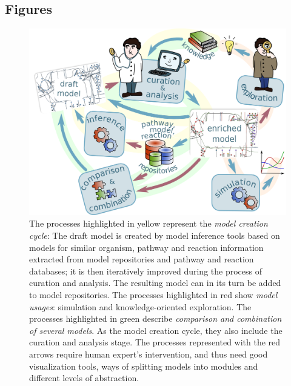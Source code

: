 \documentclass{bmcart}
\begin{document}
\begin{backmatter}

\section*{Figures}


\begin{figure}[h!]
\centering
\includegraphics[scale=0.6]{workflow.png}
\caption{ 
\label{fig:workflow}
The processes highlighted in yellow represent the \emph{model creation cycle}: The draft model is created by model inference tools based on models for similar organism, pathway and reaction information extracted from model repositories and pathway and reaction databases; it is then iteratively improved during the process of curation and analysis. The resulting model can in its turn be added to model repositories.
The processes highlighted in red show \emph{model usages}: simulation and knowledge-oriented exploration.
The processes highlighted in green describe \emph{comparison and combination of several models}. As the model creation cycle, they also include the curation and analysis stage.
The processes represented with the red arrows require human expert's intervention, and thus need good visualization tools, ways of splitting models into modules and different levels of abstraction.}
\end{figure}


\end{backmatter}
\end{document}
